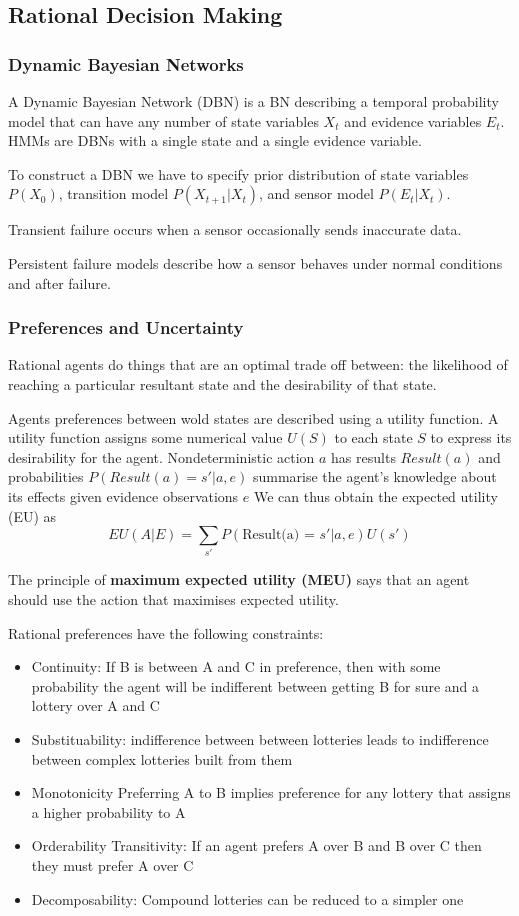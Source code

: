 \documentclass{article}
\begin{document}
 \subsection{Rational Decision Making}

 \subsubsection{Dynamic Bayesian Networks}

A Dynamic Bayesian Network (DBN) is a BN describing a temporal probability model that can have any number of state variables $X_t$ and evidence variables $E_t$. HMMs are DBNs with a single state and a single evidence variable.

To construct a DBN we have to specify prior distribution of state variables $P(X_0)$, transition model $P(X_{t+1} | X_t)$, and sensor model $P(E_t | X_t)$. 

Transient failure occurs when a sensor occasionally sends inaccurate data. 

Persistent failure models describe how a sensor behaves under normal conditions and after failure.

\subsubsection{Preferences and Uncertainty}

Rational agents do things that are an optimal trade off between: the likelihood of reaching a particular resultant state and the desirability of that state. 

Agents preferences between wold states are described using a utility function. A utility function assigns some numerical value $U(S)$ to each state $S$ to express its desirability for the agent. Nondeterministic action $a$ has results $Result(a)$ and probabilities $P(Result(a) = s'|a,e)$ summarise the agent's knowledge about its effects given evidence observations $e$ We can thus obtain the expected utility (EU) as $$EU(A|E) = \sum_{s'}P(\text{Result(a) = } s'|a,e)U(s')$$

The principle of \textbf{maximum expected utility (MEU)} says that an agent should use the action that maximises expected utility. 

Rational preferences have the following constraints:
\begin{itemize}
    \item Continuity: If B is between A and C in preference, then with some probability the agent will be indifferent between getting B for sure and a lottery over A and C
    \item Substituability: indifference between between lotteries leads to indifference between complex lotteries built from them
    \item Monotonicity Preferring A to B implies preference for any lottery that assigns a higher probability to A
    \item Orderability 
    Transitivity: If an agent prefers A over B and B over C then they must prefer A over C
    \item Decomposability: Compound lotteries can be reduced to a simpler one
\end{itemize}
\end{document}
